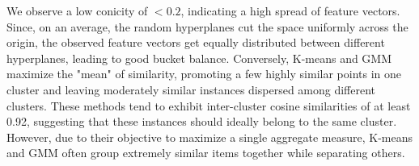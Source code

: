 \documentclass[letterpaper]{article}
\begin{document}
We observe a low conicity of $<0.2$, indicating a high spread of feature vectors. Since, on an average, the random hyperplanes cut the space uniformly across the origin, the observed feature vectors get equally distributed between
different hyperplanes, leading to good bucket balance.
Conversely, K-means and GMM maximize the "mean" of similarity, promoting a few highly similar points in one cluster and leaving moderately similar instances dispersed among different clusters. These methods tend to exhibit inter-cluster cosine similarities of at least 0.92, suggesting that these instances should ideally belong to the same cluster. However, due to their objective to maximize a single aggregate measure, K-means and GMM often group extremely similar items together while separating others.












\end{document}
